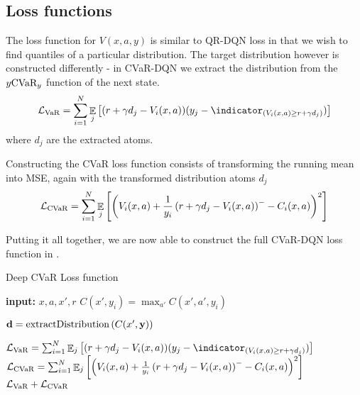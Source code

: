 \subsection{Loss functions}
The loss function for $V(x, a, y)$ is similar to QR-DQN loss in that we wish to find quantiles of a particular distribution. The target distribution however is constructed differently - in CVaR-DQN we extract the distribution from the $y\text{CVaR}_y$ function of the next state.
\begin{equation}
\mathcal{L}_{\var}=\sum_{i=1}^{N} \expect_j\bsquare{(r + \gamma d_j - V_i(x, a))(y_j - \indicator_{(V_i(x, a) \ge r + \gamma d_j)})}
\end{equation}
where $d_j$ are the extracted atoms.

Constructing the CVaR loss function consists of transforming the running mean into MSE, again with the transformed distribution atoms $d_j$
\begin{equation}
\mathcal{L}_{\text{CVaR}}=\sum_{i=1}^{N} \mathop{\mathbb{E}}_j\left[ {\left( {V_i(x, a) + \frac{1}{y_i} \left( {r + \gamma d_j - V_i(x, a)} \right)^- - C_i(x, a)} \right)^2} \right]
\end{equation}


Putting it all together, we are now able to construct the full CVaR-DQN loss function in .

\begin{algorithm}
\caption{Deep CVaR Loss function}
\begin{algorithmic}\label{alg:cvardqnloss}

    \STATE \textbf{input:} $x, a, x', r$
    \bindent
	\STATE $C(x', y_i) = \max_{a'} C(x', a', y_i)$
	\ENDFOR
	
	\STATE $\mathbf{d}= \text{extractDistribution}\left( {C(x', \mathbf{y})} \right)$

	
	\STATE $\mathcal{L}_{\var}=\sum_{i=1}^{N} \expect_j\bsquare{(r + \gamma d_j - V_i(x, a))(y_j - \indicator_{(V_i(x, a) \ge r + \gamma d_j)})}$
	\STATE $\mathcal{L}_{\text{CVaR}}=\sum_{i=1}^{N} \mathop{\mathbb{E}}_j\left[ {\left( {V_i(x, a) + \frac{1}{y_i} \left( {r + \gamma d_j - V_i(x, a)} \right)^- - C_i(x, a)} \right)^2} \right]$
	\eindent
	\RETURN $\mathcal{L}_{\text{VaR}} + \mathcal{L}_{\text{CVaR}}$
	
\end{algorithmic}
\end{algorithm}

